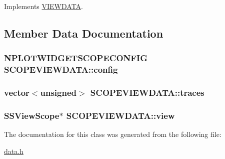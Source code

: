 Implements \hyperlink{class_v_i_e_w_d_a_t_a_1b4cca271e32b8d47b615e75dbf0624e}{VIEWDATA}.

\subsection{Member Data Documentation}
\hypertarget{class_s_c_o_p_e_v_i_e_w_d_a_t_a_12a2f98e84e1c9df7d618279cb78487c}{
\subsubsection[{config}]{\setlength{\rightskip}{0pt plus 5cm}NPLOTWIDGETSCOPECONFIG {\bf SCOPEVIEWDATA::config}}}
\label{class_s_c_o_p_e_v_i_e_w_d_a_t_a_12a2f98e84e1c9df7d618279cb78487c}


\hypertarget{class_s_c_o_p_e_v_i_e_w_d_a_t_a_96b9facdb199b5028186fdc2249c1053}{
\subsubsection[{traces}]{\setlength{\rightskip}{0pt plus 5cm}vector$<$unsigned$>$ {\bf SCOPEVIEWDATA::traces}}}
\label{class_s_c_o_p_e_v_i_e_w_d_a_t_a_96b9facdb199b5028186fdc2249c1053}


\hypertarget{class_s_c_o_p_e_v_i_e_w_d_a_t_a_fb39fef6e2e245300dcdbe30374972dd}{
\subsubsection[{view}]{\setlength{\rightskip}{0pt plus 5cm}SSViewScope$\ast$ {\bf SCOPEVIEWDATA::view}}}
\label{class_s_c_o_p_e_v_i_e_w_d_a_t_a_fb39fef6e2e245300dcdbe30374972dd}




The documentation for this class was generated from the following file:\begin{CompactItemize}
\item 
\hyperlink{data_8h}{data.h}\end{CompactItemize}
